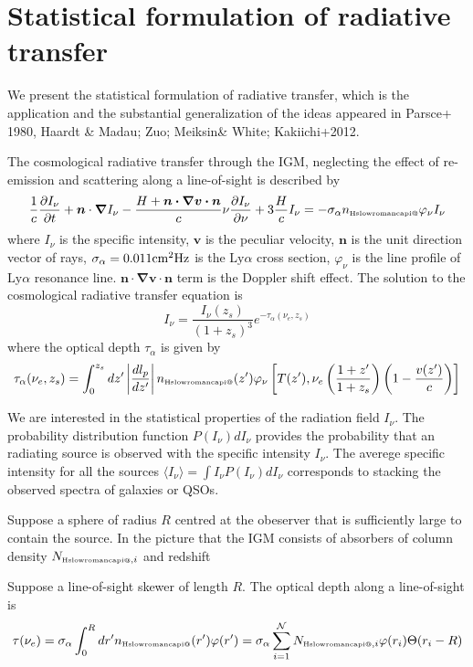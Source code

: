 \documentclass[useAMS,usenatbib,twocolumn]{mn2e}
\makeatletter
\newcommand{\Rmnum}[1]{\expandafter\@slowromancap\romannumeral #1@}
\newcommand{\nHI}{n_{\mbox{\tiny H\Rmnum{1}}}}
\newcommand{\LyA}{\mbox{Ly}\alpha}
\newcommand{\NHIi}{N_{\mbox{\tiny H\Rmnum{1}},i}}
\makeatother
\begin{document}





\appendix
\section{Statistical formulation of radiative transfer}\label{appendix}
We present the statistical formulation of radiative transfer, which is
the application and the substantial generalization of the ideas appeared 
in Parsce+ 1980, Haardt \& Madau; Zuo; Meiksin\& White; Kakiichi+2012.

The cosmological radiative transfer through the IGM, neglecting the effect
of re-emission and scattering along a line-of-sight is described by
\begin{equation}
\frac{1}{c}\frac{\partial I_{\nu}}{\partial t}
+\boldsymbol{n}\cdot\boldsymbol\nabla I_{\nu}
-\frac{H+\boldsymbol{n\cdot\nabla v\cdot n}}{c}
\nu\frac{\partial I_{\nu}}{\partial \nu}+
3\frac{H}{c}I_{\nu}=-\sigma_\alpha\nHI\varphi_\nu I_{\nu}
\end{equation}
where $I_\nu$ is the specific intensity, $\boldsymbol{v}$ is the peculiar 
velocity, $\boldsymbol{n}$ is the unit direction vector of rays, 
$\sigma_\alpha=0.011\rm cm^2Hz$ is the $\LyA$ cross section,
$\varphi_\nu$ is the line profile of $\LyA$ resonance line. 
$\boldsymbol{n\cdot\nabla v\cdot n}$ term is the Doppler shift effect.
The solution to the cosmological radiative transfer equation is
\begin{equation}
I_\nu=\frac{I_\nu(z_s)}{(1+z_s)^3}e^{-\tau_\alpha(\nu_e,z_s)}
\end{equation}
where the optical depth $\tau_\alpha$ is given by
\begin{equation}
\tau_\alpha(\nu_e,z_s)=\int_0^{z_s}dz'\left|\frac{dl_p}{dz'}\right|
\nHI(z')\varphi_\nu\left[T(z'),\nu_e\left(\frac{1+z'}{1+z_s}\right)
\left(1-\frac{v(z')}{c}\right)\right]
\end{equation}
 
We are interested in the statistical properties of the radiation field $I_\nu$.
The probability distribution function $P(I_\nu)dI_\nu$ provides the probability
that an radiating source is observed  with the specific intensity $I_\nu$.
The averege specific intensity for all the sources 
$\langle I_\nu\rangle=\int I_\nu P(I_\nu)dI_\nu$ corresponds to stacking the 
observed spectra of galaxies or QSOs. 

Suppose a sphere of radius $R$ centred at the obeserver that is sufficiently 
large to contain the source. In the picture that the IGM consists of absorbers
of column density $\NHIi$ and redshift


Suppose a line-of-sight skewer of length $R$.
The optical depth along a line-of-sight is
\begin{equation}
\tau(\nu_e)=\sigma_\alpha\int_0^R dr' \nHI(r')\varphi(r')
=\sigma_\alpha\sum_{i=1}^{\mathcal{N}} \NHIi\varphi(r_i) \Theta(r_i-R)
\end{equation}


\label{lastpage}
\end{document}
